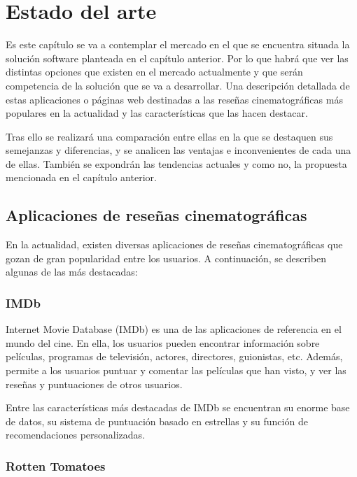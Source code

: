 \chapter{Estado del arte}

Es este capítulo se va a contemplar el mercado en el que se encuentra situada la solución software 
planteada en el capítulo anterior. Por lo que habrá que ver las distintas opciones que existen en el 
mercado actualmente y que serán competencia de la solución que se va a desarrollar. Una descripción 
detallada de estas aplicaciones o páginas web destinadas a las reseñas cinematográficas más populares 
en la actualidad y las características que las hacen destacar.

Tras ello se realizará una comparación entre ellas en la que se destaquen sus semejanzas y diferencias, 
y se analicen las ventajas e inconvenientes de cada una de ellas. También se expondrán las tendencias 
actuales y como no, la propuesta mencionada en el capítulo anterior.

\section{Aplicaciones de reseñas cinematográficas}

En la actualidad, existen diversas aplicaciones de reseñas cinematográficas que gozan de gran 
popularidad entre los usuarios. A continuación, se describen algunas de las más destacadas:

\subsection{IMDb}

Internet Movie Database (IMDb) es una de las aplicaciones de referencia en el mundo del cine. En ella, 
los usuarios pueden encontrar información sobre películas, programas de televisión, actores, 
directores, guionistas, etc. Además, permite a los usuarios puntuar y comentar las películas que han 
visto, y ver las reseñas y puntuaciones de otros usuarios.

Entre las características más destacadas de IMDb se encuentran su enorme base de datos, su sistema de 
puntuación basado en estrellas y su función de recomendaciones personalizadas.

\subsection{Rotten Tomatoes}

